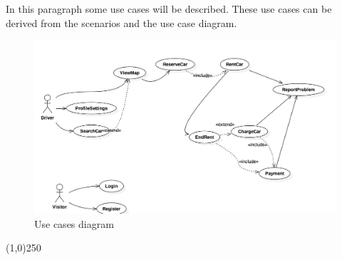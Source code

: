 In this paragraph some use cases will be described. These use cases can be derived from the scenarios and the use case diagram.

\begin{figure}[H]
   \begin{center}
    \includegraphics[width=\textwidth]{Resources/UseCaseModel.png}
    \caption{Use cases diagram}
   \end{center}
    \label{fig:UseCasesDiagram}
\end{figure}

\begin{center}
\line(1,0){250}
\end{center}

